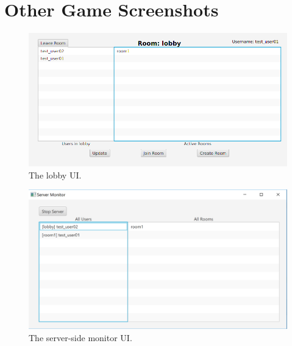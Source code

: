 \chapter{Other Game Screenshots}
\begin{figure}[htbp]
    \centering
    \includegraphics[width=\textwidth]{figures/lobby.png}
    \caption{The lobby UI.}
    \label{fig:lobbyUI}
\end{figure}
\begin{figure}
    \centering
    \includegraphics[width=\textwidth]{figures/servermonitor.png}
    \caption{The server-side monitor UI.}
    \label{fig:servermonitor}
\end{figure}